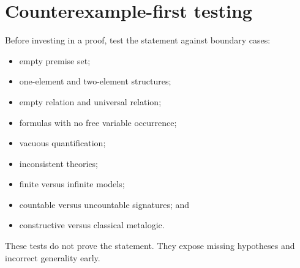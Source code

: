 \section{Counterexample-first testing}
\label{sec:research-workflow-02}

Before investing in a proof, test the statement against boundary cases:
\begin{itemize}
  \item empty premise set;
  \item one-element and two-element structures;
  \item empty relation and universal relation;
  \item formulas with no free variable occurrence;
  \item vacuous quantification;
  \item inconsistent theories;
  \item finite versus infinite models;
  \item countable versus uncountable signatures; and
  \item constructive versus classical metalogic.
\end{itemize}
These tests do not prove the statement.  They expose missing hypotheses and
incorrect generality early.

